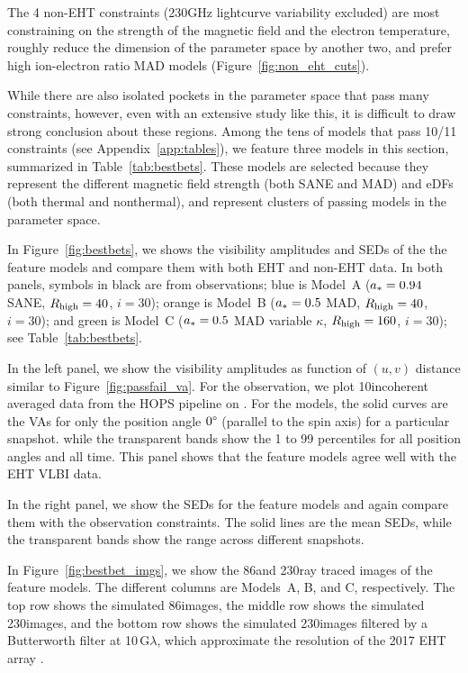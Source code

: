 The 4 non-EHT constraints (230GHz lightcurve variability excluded) are
most constraining on the strength of the magnetic field and the
electron temperature, roughly reduce the dimension of the parameter
space by another two, and prefer high ion-electron ratio MAD models
(Figure~\ref{fig:non_eht_cuts}).

While there are also isolated pockets in the parameter space that pass
many constraints, however, even with an extensive study like this, it
is difficult to draw strong conclusion about these regions.
Among the tens of models that pass 10/11 constraints (see
Appendix~\ref{app:tables}), we feature three models in this section,
summarized in Table~\ref{tab:bestbets}.
These models are selected because they represent the different
magnetic field strength (both SANE and MAD) and eDFs (both thermal and
nonthermal), and represent clusters of passing models in the parameter
space.

In Figure~\ref{fig:bestbets}, we shows the visibility amplitudes and
SEDs of the the feature models and compare them with both EHT and
non-EHT data.
In both panels, symbols in black are from observations; blue is
Model~A ($a_*=0.94$ SANE, $R_\mathrm{high}=40$, $i=30$); orange is Model~B
($a_*=0.5$ MAD, $R_\mathrm{high}=40$, $i=30$); and green is Model~C ($a_*=0.5$
MAD variable $\kappa$, $R_\mathrm{high}=160$, $i=30$); see
Table~\ref{tab:bestbets}.

In the left panel, we show the visibility amplitudes as function of
$(u, v)$ distance similar to Figure~\ref{fig:passfail_va}.
For the observation, we plot 10\sec incoherent averaged data from the
HOPS pipeline on \aprilvii.
For the models, the solid curves are the VAs for only the position
angle $0\degree$ (parallel to the spin axis) for a particular
snapshot.
while the transparent bands show the 1 to 99 percentiles for all
position angles and all time.
This panel shows that the feature models agree well with the EHT VLBI
data.

In the right panel, we show the SEDs for the feature models and again
compare them with the observation constraints.
The solid lines are the mean SEDs, while the transparent bands show
the range across different snapshots.

In Figure~\ref{fig:bestbet_imgs}, we show the 86\GHz and 230\GHz ray
traced images of the feature models.
The different columns are Models~A, B, and C, respectively.
The top row shows the simulated 86\GHz images, the middle row shows
the simulated 230\GHz images, and the bottom row shows the simulated
230\GHz images filtered by a Butterworth filter at
10$\,\mathrm{G}\lambda$, which approximate the resolution of the 2017
EHT array \citep{2020arXiv200406210P}.

